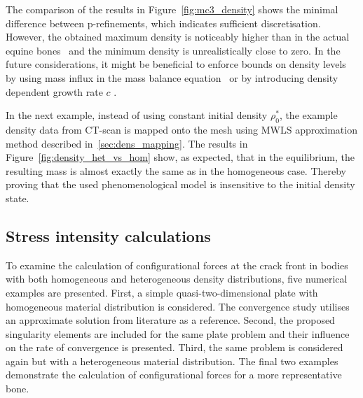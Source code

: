 \documentclass[twocolumn]{svjour3}
\begin{document}
The comparison of the results in Figure~\ref{fig:mc3_density} shows the minimal difference between p-refinements, which indicates sufficient discretisation.
However, the obtained maximum density is noticeably higher than in the actual equine bones~\cite{yamada2015experimental} and the minimum density is unrealistically close to zero. In the future considerations, it might be beneficial to enforce bounds on density levels by using mass influx in the mass balance equation~\cite{sharma2013adaptive} or by introducing density dependent growth rate $c$ \citep{waffenschmidt2012application}. 

In the next example, instead of using constant initial density $\rho_0 ^\ast$, the example density data from CT-scan is mapped onto the mesh using MWLS approximation method described in~\ref{sec:dens_mapping}. The results in Figure~\ref{fig:density_het_vs_hom} show, as expected, that in the equilibrium, the resulting mass is almost exactly the same as in the homogeneous case. Thereby proving that the used phenomenological model is insensitive to the initial density state. 


\subsection{Stress intensity calculations}
\label{sec:release_energy_rate}
To examine the calculation of configurational forces at the crack front in bodies with both homogeneous and heterogeneous density distributions, five numerical examples are presented.
First, a simple quasi-two-dimensional plate with homogeneous material distribution is considered.  The convergence study utilises an approximate solution from literature as a reference.
Second, the proposed singularity elements are included for the same plate problem and their influence on the rate of convergence is presented. 
Third, the same problem is considered again but with a heterogeneous material distribution.
The final two examples demonstrate the calculation of configurational forces for a more representative bone.
 
\end{document}
